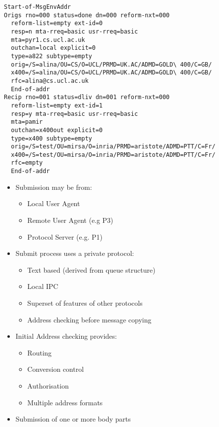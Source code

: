 \begin {bwslide}

\footnotesize
\begin{verbatim}
Start-of-MsgEnvAddr  
Origs rno=000 status=done dn=000 reform-nxt=000 
  reform-list=empty ext-id=0   
  resp=n mta-rreq=basic usr-rreq=basic 
  mta=pyr1.cs.ucl.ac.uk   
  outchan=local explicit=0 
  type=a822 subtype=empty   
  orig=/S=alina/OU=CS/O=UCL/PRMD=UK.AC/ADMD=GOLD\ 400/C=GB/ 
  x400=/S=alina/OU=CS/O=UCL/PRMD=UK.AC/ADMD=GOLD\ 400/C=GB/ 
  rfc=alina@cs.ucl.ac.uk
  End-of-addr  
Recip rno=001 status=dliv dn=001 reform-nxt=000 
  reform-list=empty ext-id=1   
  resp=y mta-rreq=basic usr-rreq=basic 
  mta=pamir 
  outchan=x400out explicit=0 
  type=x400 subtype=empty   
  orig=/S=test/OU=mirsa/O=inria/PRMD=aristote/ADMD=PTT/C=Fr/   
  x400=/S=test/OU=mirsa/O=inria/PRMD=aristote/ADMD=PTT/C=Fr/   
  rfc=empty 
  End-of-addr  
\end{verbatim}
\end {bwslide}


\begin {bwslide}
\vspace{2ex}

\end {bwslide}


\begin {bwslide}
\begin {itemize}
\item Submission may be from:
\begin {itemize}
\item Local User Agent
\item Remote User Agent (e.g P3)
\item Protocol Server (e.g. P1)
\end {itemize}

\item Submit process uses a private protocol:
\begin {itemize}
\item Text based (derived from queue structure)
\item Local IPC
\item Superset of features of other protocols
\item Address checking before message copying
\end {itemize}

\item Initial Address checking provides:
\begin {itemize}
\item Routing
\item Conversion control
\item Authorisation
\item Multiple address formats
\end {itemize}

\item Submission of one or more body parts

\end {itemize}
\end {bwslide}



